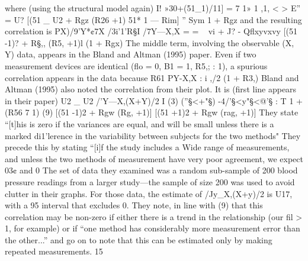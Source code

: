where (using the structural model again)
I! »30+(51_1)/11]
= 7
1» 1 ,1, < >
E” = U? [(51 _ U2 + Rgz (R26 +1) 51* 1 — Rim]
” Sym 1 + Rgz
and the resulting correlation is
PX)/9'Y*¢7X /3i’1’R§I
/7Y—X,X = = ~
\/vi + J? - Qﬂxyvxvy \/[(51 -1)? + R§,, (R5, +1)l (1 + Rgx)
The middle term, involving the observable (X, Y) data, appears in the Bland and
Altman (1995) paper. Even if two measurement devices are identical (ﬂo = 0, B1 = 1,
R5,; : 1), a spurious correlation appears in the data because
R61
PY-X,X : i
,/2 (1 + R3,)
Bland and Altman (1995) also noted the correlation from their plot. It is (ﬁrst
line appears in their paper)
U2 _ U2
/'Y—X,(X+Y)/2 I   (3)
\/ (”§<+"§) -4/’§<y"§<@’§
:  T 1 +  (R56 7 1) (9)
\/[(51 -1)2 + Rgw (Rg, +1)] [(51 +1)2 + Rgw (rag, +1)]
They state “[t]his is zero if the variances are equal, and will be small unless there
is a marked di1'lerence in the variability between subjects for the two methods" They
precede this by stating “[i]f the study includes a Wide range of measurements, and
unless the two methods of measurement have very poor agreement, we expect 03¢ and
0%
The set of data they examined was a random sub-sample of 200 blood pressure
readings from a larger study—the sample of size 200 was used to avoid clutter in their
graphs. For those data, the estimate of /Jy_X,(X+y)/2 is U17, with a 95%
interval that excludes 0. They note, in line with (9) that this correlation may be
non-zero if either there is a trend in the relationship (our ﬁl > 1, for example) or if
“one method has considerably more measurement error than the other...” and go on
to note that this can be estimated only by making repeated measurements.
15



